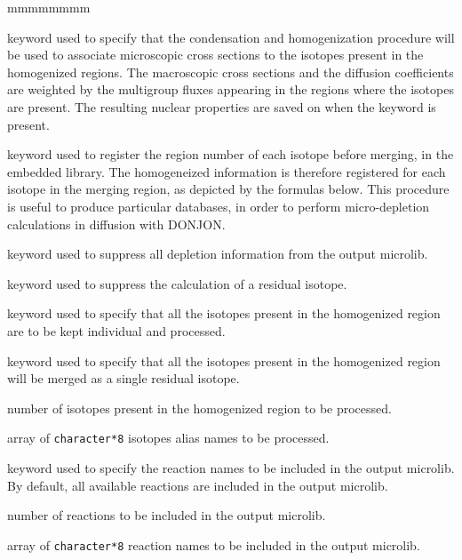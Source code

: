 \begin{ListeDeDescription}{mmmmmmmm}
\item[\moc{MICR}] keyword used to specify that the condensation and homogenization
procedure will be used to associate microscopic cross sections to the isotopes
present in the homogenized regions. The macroscopic cross sections and the
diffusion coefficients are weighted by the multigroup fluxes appearing in the
regions where the isotopes are present. The resulting nuclear properties are
saved on  when the  keyword is present.

\item[\moc{ALLX}] keyword used to register the region number of each isotope before merging, in the 
embedded library. The homogeneized information is therefore registered for each isotope in the merging
region, as depicted by the formulas below. This procedure is useful to produce particular databases, 
in order to perform micro-depletion calculations in diffusion with DONJON.

\item[\moc{NODEPL}] keyword used to suppress all depletion information from the output microlib.

\item[\moc{NOMACR}] keyword used to suppress the calculation of a residual isotope.

\item[\moc{ALL}] keyword used to specify that all the isotopes present in the
homogenized region are to be kept individual and processed.

\item[\moc{RES}] keyword used to specify that all the isotopes present in the
homogenized region will be merged as a single residual isotope.

\item[\dusa{nis}] number of isotopes present in the homogenized
region to be processed.

\item[\dusa{HISO}] array of {\tt character*8} isotopes alias names to be processed.

\item[\moc{REAC}] keyword used to specify the reaction names to be included in the output microlib. By default, all available reactions
are included in the output microlib.

\item[\dusa{nreac}] number of reactions to be included in the output microlib.

\item[\dusa{HREAC}] array of {\tt character*8} reaction names to be included in the output microlib.


\end{ListeDeDescription}
